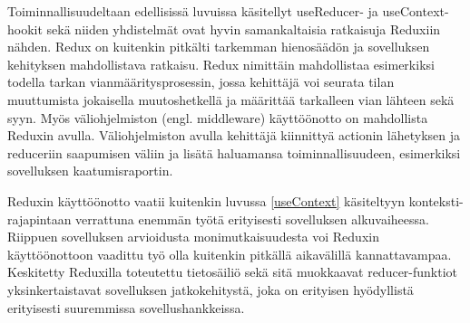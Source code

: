 Toiminnallisuudeltaan edellisissä luvuissa käsitellyt useReducer- ja useContext-hookit sekä niiden yhdistelmät ovat hyvin samankaltaisia ratkaisuja Reduxiin nähden. Redux on kuitenkin pitkälti tarkemman hienosäädön ja sovelluksen kehityksen mahdollistava ratkaisu. Redux nimittäin mahdollistaa esimerkiksi todella tarkan vianmääritysprosessin, jossa kehittäjä voi seurata tilan muuttumista jokaisella muutoshetkellä ja määrittää tarkalleen vian lähteen sekä syyn. Myös väliohjelmiston (engl. middleware) käyttöönotto on mahdollista Reduxin avulla. Väliohjelmiston avulla kehittäjä kiinnittyä actionin lähetyksen ja reduceriin saapumisen väliin ja lisätä haluamansa toiminnallisuudeen, esimerkiksi sovelluksen kaatumisraportin. \cite{reduxdocsmiddleware}

Reduxin käyttöönotto vaatii kuitenkin luvussa \ref{useContext} käsiteltyyn konteksti-rajapintaan verrattuna enemmän työtä erityisesti sovelluksen alkuvaiheessa. Riippuen sovelluksen arvioidusta monimutkaisuudesta voi Reduxin käyttöönottoon vaadittu työ olla kuitenkin pitkällä aikavälillä kannattavampaa. Keskitetty Reduxilla toteutettu tietosäiliö sekä sitä muokkaavat reducer-funktiot yksinkertaistavat sovelluksen jatkokehitystä, joka on erityisen hyödyllistä erityisesti suuremmissa sovellushankkeissa. \cite[531]{proreact}